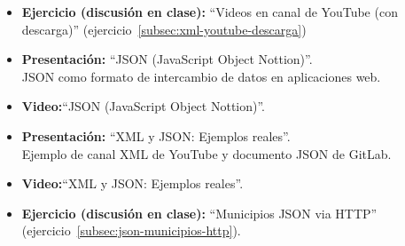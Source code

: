\documentclass[a4paper,12pt]{article}
\begin{document}
\begin{itemize}
\item \textbf{Ejercicio (discusión en clase):} ``Videos en canal de YouTube (con descarga)'' (ejercicio~\ref{subsec:xml-youtube-descarga})
\item \textbf{Presentación:} ``JSON (JavaScript Object Nottion)''. \\
  JSON como formato de intercambio de datos en aplicaciones web.
\item \textbf{Video:}``JSON (JavaScript Object Nottion)''.
\item \textbf{Presentación:} ``XML y JSON: Ejemplos reales''. \\
  Ejemplo de canal XML de YouTube y documento JSON de GitLab.
\item \textbf{Video:}``XML y JSON: Ejemplos reales''.
\item \textbf{Ejercicio (discusión en clase):} ``Municipios JSON via HTTP'' (ejercicio~\ref{subsec:json-municipios-http}).
\end{itemize}

\end{document}
